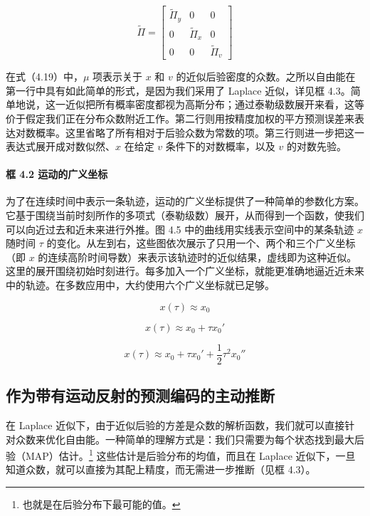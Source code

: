 \begin{equation}
\tilde{\Pi}
=
\begin{bmatrix}
\tilde{\Pi}_y & 0 & 0 \\
0 & \tilde{\Pi}_x & 0 \\
0 & 0 & \tilde{\Pi}_v
\end{bmatrix}
\tag{4.19}
\end{equation}

在式（4.19）中，$\mu$ 项表示关于 $x$ 和 $v$ 的近似后验密度的众数。之所以自由能在第一行中具有如此简单的形式，是因为我们采用了 Laplace 近似，详见框 4.3。简单地说，这一近似把所有概率密度都视为高斯分布；通过泰勒级数展开来看，这等价于假定我们正在分布众数附近工作。第二行则用按精度加权的平方预测误差来表达对数概率。这里省略了所有相对于后验众数为常数的项。第三行则进一步把这一表达式展开成对数似然、$x$ 在给定 $v$ 条件下的对数概率，以及 $v$ 的对数先验。

\paragraph{框 4.2 运动的广义坐标}
为了在连续时间中表示一条轨迹，运动的广义坐标提供了一种简单的参数化方案。它基于围绕当前时刻所作的多项式（泰勒级数）展开，从而得到一个函数，使我们可以向近过去和近未来进行外推。图 4.5 中的曲线用实线表示空间中的某条轨迹 $x$ 随时间 $\tau$ 的变化。从左到右，这些图依次展示了只用一个、两个和三个广义坐标（即 $x$ 的连续高阶时间导数）来表示该轨迹时的近似结果，虚线即为这种近似。这里的展开围绕初始时刻进行。每多加入一个广义坐标，就能更准确地逼近近未来中的轨迹。在多数应用中，大约使用六个广义坐标就已足够。

\begin{equation}
x(\tau) \approx x_0
\end{equation}

\begin{equation}
x(\tau) \approx x_0 + \tau x_0'
\end{equation}

\begin{equation}
x(\tau) \approx x_0 + \tau x_0' + \frac{1}{2}\tau^2 x_0''
\end{equation}

\subsection{作为带有运动反射的预测编码的主动推断}

在 Laplace 近似下，由于近似后验的方差是众数的解析函数，我们就可以直接针对众数来优化自由能。一种简单的理解方式是：我们只需要为每个状态找到最大后验（MAP）估计。\footnote{也就是在后验分布下最可能的值。} 这些估计是后验分布的均值，而且在 Laplace 近似下，一旦知道众数，就可以直接为其配上精度，而无需进一步推断（见框 4.3）。

